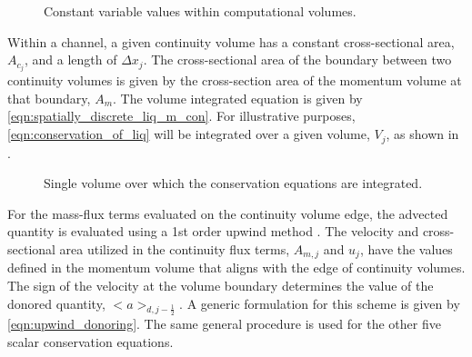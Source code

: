\begin{figure}[ht]
\begin{center}
\end{center}
\caption{Constant variable values within computational volumes.}
\label{fig:constant_value}
\end{figure}

Within a channel, a given continuity volume has a constant cross-sectional area, $A_{c_{j}}$, and a length of $\Delta x_{j}$.
The cross-sectional area of the boundary between two continuity volumes is given by the cross-section area of the momentum volume at that boundary, $A_{m}$.
The volume integrated equation is given by \eqref{eqn:spatially_discrete_liq_m_con}.
For illustrative purposes, \eqref{eqn:conservation_of_liq} will be integrated over a given volume, $V_j$, as shown in .

\begin{figure}[h!t]
\begin{center}
\end{center}
\caption{Single volume over which the conservation equations are integrated.}
\label{fig:single_volume}
\end{figure}

For the mass-flux terms evaluated on the continuity volume edge, the advected quantity is evaluated using a 1st order upwind method \cite{Tannehill1997}.
The velocity and cross-sectional area utilized in the continuity flux terms, $A_{m,j}$ and $u_j$, have the values defined in the momentum volume that aligns with the edge of continuity volumes.
The sign of the velocity at the volume boundary determines the value of the donored quantity, $<a>_{d,j-\frac{1}{2}}$.
A generic formulation for this scheme is given by \eqref{eqn:upwind_donoring}.
The same general procedure is used for the other five scalar conservation equations.

